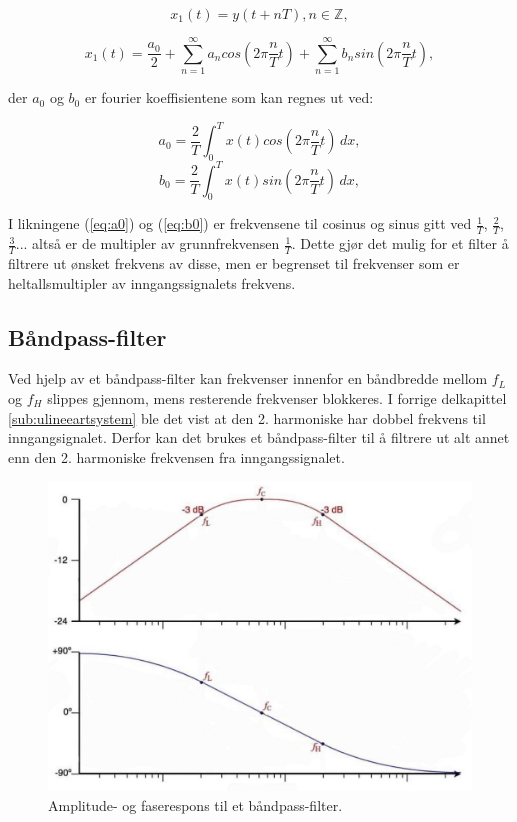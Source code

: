 \documentclass[a4paper,11pt,norsk]{article}
\begin{document}
\begin{equation*}
    x_1(t) =  y(t + n T),  n \in \mathbb{Z},
\end{equation*}

\begin{equation*}
    x_1(t) =  \frac{a_0}{2} + \displaystyle\sum_{n=1}^{\infty} a_n cos(2\pi \frac{n }{T}t) + \displaystyle\sum_{n=1}^{\infty} b_n sin(2\pi \frac{n}{T}t),
\end{equation*}

der $a_0$ og $b_0$ er fourier koeffisientene som kan regnes ut ved:

\begin{equation}
    a_0 = \frac{2}{T} \int_{0}^{T} x(t)cos(2\pi \frac{n}{T}t) \,dx ,
    \label{eq:a0}
\end{equation}
\begin{equation}
    b_0 = \frac{2}{T} \int_{0}^{T} x(t)sin(2\pi \frac{n}{T}t) \,dx ,
    \label{eq:b0}
\end{equation}

I likningene (\ref{eq:a0}) og (\ref{eq:b0}) er frekvensene til cosinus og sinus gitt ved $\frac{1}{T}$, $\frac{2}{T}$, $\frac{3}{T}$... altså er de multipler av grunnfrekvensen $\frac{1}{T}$. Dette gjør det mulig for et filter å filtrere ut ønsket frekvens av disse, men er begrenset til frekvenser som er heltallsmultipler av inngangssignalets frekvens.

\subsection{Båndpass-filter}
\label{sub:bandpassfilter}

Ved hjelp av et båndpass-filter kan frekvenser innenfor en båndbredde mellom $f_{L}$ og $f_H$ slippes gjennom, mens resterende frekvenser blokkeres. I forrige delkapittel \ref{sub:ulineeartsystem} ble det vist at den 2. harmoniske har dobbel frekvens til inngangsignalet. Derfor kan det brukes et båndpass-filter til å filtrere ut alt annet enn den 2. harmoniske frekvensen fra inngangssignalet. 

\begin{figure}[H]
  \centering
  \includegraphics[scale=0.4]{D1/Images/response.jpg}
  \caption{Amplitude- og faserespons til et båndpass-filter.}
  \label{fig:4}
\end{figure}
\end{document}
